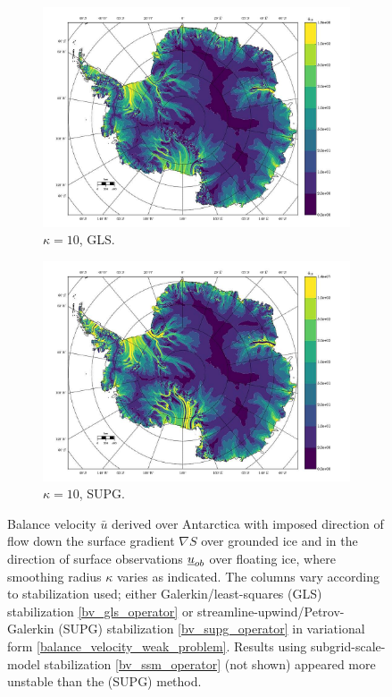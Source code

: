 \begin{figure}
  \begin{subfigure}[b]{0.45\linewidth}
    \includegraphics[width=\linewidth]{images/balance_velocity/antarctica/d_U_ob_S/Ubar_10H_kappa_10_GLS.jpg}
  \caption{$\kappa = 10$, GLS.}
  \label{antarctica_bv_image_kappa_5_GLS_U_ob_S}
  \end{subfigure}
  \begin{subfigure}[b]{0.45\linewidth}
    \includegraphics[width=\linewidth]{images/balance_velocity/antarctica/d_U_ob_S/Ubar_10H_kappa_10_SUPG.jpg}
  \caption{$\kappa = 10$, SUPG.}
  \label{antarctica_bv_image_kappa_5_SUPG_U_ob_S}
  \end{subfigure}
  
  \caption[Antarctica balance-velocity with $\mathbf{d}^{\text{data}} = \mathbf{u}_{ob}$ over shelves.]{Balance velocity $\bar{u}$ derived over Antarctica with imposed direction of flow down the surface gradient $\nabla S$ over grounded ice and in the direction of surface observations $\underline{u}_{ob}$ over floating ice, where smoothing radius $\kappa$ varies as indicated.  The columns vary according to stabilization used; either Galerkin/least-squares (GLS) stabilization \cref{bv_gls_operator} or streamline-upwind/Petrov-Galerkin (SUPG) stabilization \cref{bv_supg_operator} in variational form \cref{balance_velocity_weak_problem}.  Results using subgrid-scale-model stabilization \cref{bv_ssm_operator} (not shown) appeared more unstable than the (SUPG) method. \newline}


\end{figure}
